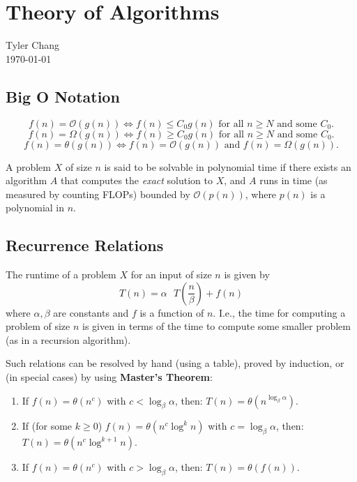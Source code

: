 \documentclass[12pt]{article}
\begin{document}
\section*{Theory of Algorithms}
Tyler Chang\\
\today

\subsection*{Big O Notation}

$$f(n) = \mathcal{O}\left(g(n)\right) 
\iff f(n) \leq C_0 g(n) \text{ for all } 
n \geq N \text{ and some } C_0.$$
$$f(n) = \Omega\left(g(n)\right) 
\iff f(n) \geq C_0 g(n) \text{ for all } 
n \geq N \text{ and some } C_0.$$
$$f(n) = \theta\left(g(n)\right)
\iff f(n) = \mathcal{O}\left(g(n)\right)
\text{ and }
f(n) = \Omega\left(g(n)\right).$$

A problem $X$ of size $n$ is said to be solvable in polynomial time 
if there exists an algorithm $A$ that computes the {\it exact} solution 
to $X$, and $A$ runs in time (as measured by counting FLOPs) bounded by 
$\mathcal{O}(p(n))$, where $p(n)$ is a polynomial in $n$.

\subsection*{Recurrence Relations}

The runtime of a problem $X$ for an input
of size $n$ is given by 
$$T(n) = \alpha\text{ }T\left(\frac{n}{\beta}\right) + f(n)$$
where $\alpha,\beta$ are constants and $f$ is a function
of $n$.
I.e., the time for computing a problem of size $n$ is given in
terms of the time to compute some smaller problem 
(as in a recursion algorithm).

Such relations can be resolved by hand (using a table),
proved by induction,
or (in special cases) by using {\bf Master's Theorem}:
\begin{enumerate}
\item If $f(n) = \theta(n^c)$ with $c < \log_\beta \alpha$,
then: $T(n) = \theta\left(n^{\log_\beta \alpha}\right)$.
\item If (for some $k \geq 0$) 
$f(n) = \theta(n^c\log^k n)$ with $c = \log_\beta \alpha$,
then: $T(n) = \theta\left(n^c \log^{k+1} n\right)$.
\item If $f(n) = \theta(n^c)$ with $c > \log_\beta \alpha$,
then: $T(n) = \theta\left(f(n)\right)$.
\end{enumerate}
\end{document}
